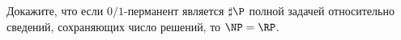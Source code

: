 Докажите, что если $0 / 1$-перманент является $\sharp \P$ полной задачей относительно сведений,
сохраняющих число решений, то $\NP = \RP$.
